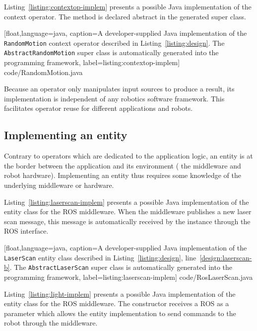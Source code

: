 
Listing~\ref{listing:contextop-implem} presents a possible Java
implementation of the  context operator. The
 method is declared abstract in the
 generated super class.

%
[float,language=java,%
caption={A developer-supplied Java implementation of the
  \texttt{Random\-Motion} context operator described in
  Listing~\ref{listing:design}. The \texttt{Abstract\-Random\-Motion}
  super class is automatically generated into the programming
  framework},%
label={listing:contextop-implem}]%
{code/RandomMotion.java}

Because an operator only manipulates input sources to produce a
result, its implementation is independent of any robotics software
framework. This facilitates operator reuse for different applications
and robots.

\subsection{Implementing an entity}

Contrary to operators which are dedicated to the application logic, an
entity is at the border between the application and its environment
(\eg{} the middleware and robot hardware). Implementing an entity thus
requires some knowledge of the underlying middleware or hardware.

Listing~\ref{listing:laserscan-implem} presents a possible Java
implementation of the  entity class for the ROS
middleware. When the middleware publishes a new laser scan message,
this message is automatically received by the 
instance through the ROS  interface.

%
[float,language=java,%
caption={A developer-supplied Java implementation of the
  \texttt{LaserScan} entity class described in
  Listing~\ref{listing:design}, line~\ref{design:laserscan-b}. The
  \texttt{Abstract\-Laser\-Scan} super class is automatically
  generated into the programming framework},%
label={listing:laserscan-implem}]%
{code/RosLaserScan.java}

Listing~\ref{listing:light-implem} presents a possible Java
implementation of the  entity class for the ROS middleware.
The constructor receives a ROS  as a parameter which
allows the entity implementation to send commands to the robot through
the middleware.


